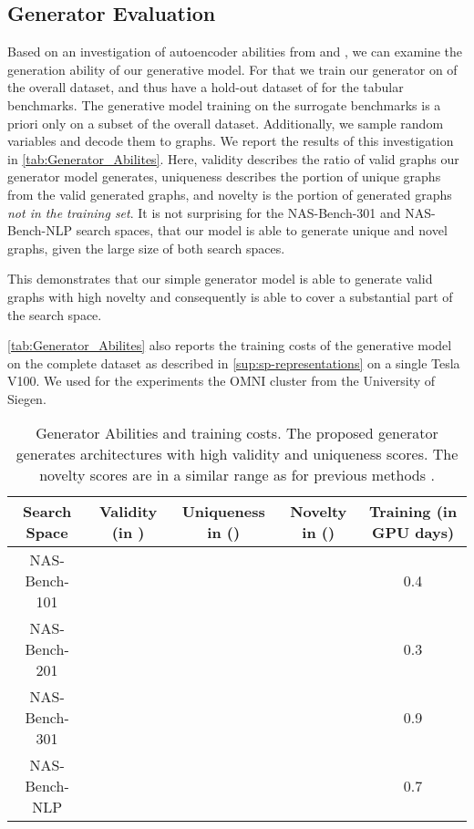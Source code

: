 \documentclass[runningheads]{llncs}
\begin{document}
\subsection{Generator Evaluation}
Based on an investigation of autoencoder abilities from \cite{2020Arch2vec} and \cite{2021SVGe}, we can examine the generation ability of our generative model.
For that we train our generator on  of the overall dataset, and thus have a hold-out dataset of  for the tabular benchmarks. The generative model training on the surrogate benchmarks is a priori only on a subset of the overall dataset.
Additionally, we sample  random variables  and decode them to graphs.
We report the results of this investigation in \autoref{tab:Generator_Abilites}.
Here, validity describes the ratio of valid graphs our generator model generates,
uniqueness describes the portion of unique graphs from the valid generated graphs, and novelty is the portion of generated graphs \emph{not in the training set}. It is not surprising for the NAS-Bench-301 and NAS-Bench-NLP search spaces, that our model is able to generate  unique and novel graphs, given the large size of both search spaces.

This demonstrates that our simple generator model is able to generate valid graphs with high novelty and consequently is able to cover a substantial part of the search space.

\autoref{tab:Generator_Abilites} also reports the training costs of the generative model on the complete dataset as described in \autoref{sup:sp-representations} on a single Tesla V100.
We used for the experiments the OMNI cluster from the University of Siegen. 

\begin{table}[t]
	\caption{Generator Abilities and training costs. The proposed generator generates architectures with high validity and uniqueness scores. The novelty scores are in a similar range as for previous methods \cite{2021SVGe}.
		\label{tab:Generator_Abilites}}
	\scriptsize
	\begin{center}
		\begin{tabular}{c|c|c|c|c }
			\toprule
			Search Space  & Validity (in ) & Uniqueness in () & Novelty in () &  Training (in GPU days)\\
			\midrule
			NAS-Bench-101 &  &  &   & 0.4 \\
			NAS-Bench-201 &  &   &  & 0.3\\
			NAS-Bench-301 &   &   &    & 0.9\\
			NAS-Bench-NLP &  &   &   & 0.7 \\
			\bottomrule
		\end{tabular}
	\end{center}
\end{table}
\end{document}
